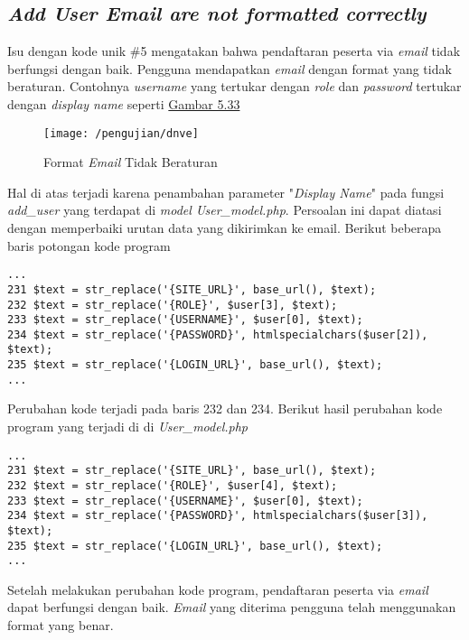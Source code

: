 	\subsection{\textit{Add User Email are not formatted correctly}}
	Isu dengan kode unik \#5 mengatakan bahwa pendaftaran peserta via \textit{email} tidak berfungsi dengan baik. Pengguna mendapatkan \textit{email} dengan format yang tidak beraturan. Contohnya \textit{username} yang tertukar dengan \textit{role} dan \textit{password} tertukar dengan \textit{display name} seperti \hyperref[fig:dnve]{Gambar 5.33} 
	\begin{figure}[H]
		\centering  
		\texttt{[image: /pengujian/dnve]}  
		\caption[Format \textit{Email} Tidak Beraturan]{Format \textit{Email} Tidak Beraturan} 
		\label{fig:dnve} 
	\end{figure}

	Hal di atas terjadi karena penambahan parameter "\textit{Display Name}" pada fungsi \textit{add\_user} yang terdapat di \textit{model User\_model.php}. Persoalan ini dapat diatasi dengan memperbaiki urutan data yang dikirimkan ke email. Berikut beberapa baris potongan kode program
\begin{lstlisting}[basicstyle=\ttfamily, frame=single,
columns=fullflexible, keepspaces=true, breaklines=true]
...
231	$text = str_replace('{SITE_URL}', base_url(), $text);
232	$text = str_replace('{ROLE}', $user[3], $text);
233	$text = str_replace('{USERNAME}', $user[0], $text);
234	$text = str_replace('{PASSWORD}', htmlspecialchars($user[2]), $text);
235	$text = str_replace('{LOGIN_URL}', base_url(), $text);
...
\end{lstlisting}
	Perubahan kode terjadi pada baris 232 dan 234. Berikut hasil perubahan kode program yang terjadi di di \textit{User\_model.php}
\begin{lstlisting}[basicstyle=\ttfamily, frame=single,
columns=fullflexible, keepspaces=true, breaklines=true]
...
231	$text = str_replace('{SITE_URL}', base_url(), $text);
232	$text = str_replace('{ROLE}', $user[4], $text);
233	$text = str_replace('{USERNAME}', $user[0], $text);
234	$text = str_replace('{PASSWORD}', htmlspecialchars($user[3]), $text);
235	$text = str_replace('{LOGIN_URL}', base_url(), $text);
...
\end{lstlisting}
	Setelah melakukan perubahan kode program, pendaftaran peserta via \textit{email} dapat berfungsi dengan baik. \textit{Email} yang diterima pengguna telah menggunakan format yang benar.
	
